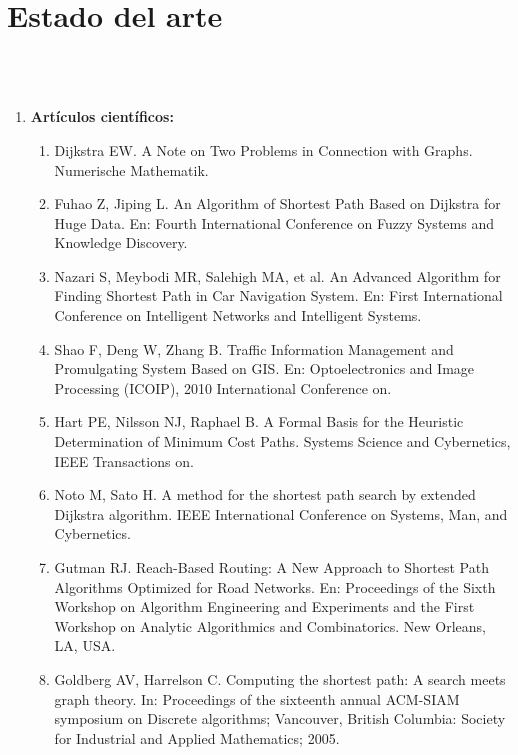 \documentclass[a4,papper]{IEEEtran}
\begin{document}
\newpage
\section{Estado del arte}
\\\\
\begin{enumerate}
    \item  {\noindent \large \bf {Artículos científicos:}}

\begin{enumerate}
    \item Dijkstra EW. A Note on Two Problems in Connection with Graphs. Numerische Mathematik.
    
    \item Fuhao Z, Jiping L. An Algorithm of Shortest Path Based on Dijkstra for Huge Data. En: Fourth
International Conference on Fuzzy Systems and Knowledge Discovery.

    \item Nazari S, Meybodi MR, Salehigh MA, et al. An Advanced Algorithm for Finding Shortest Path in Car
Navigation System. En: First International Conference on Intelligent Networks and Intelligent
Systems.

    \item Shao F, Deng W, Zhang B. Traffic Information Management and Promulgating System Based on
GIS. En: Optoelectronics and Image Processing (ICOIP), 2010 International Conference on.

    \item Hart PE, Nilsson NJ, Raphael B. A Formal Basis for the Heuristic Determination of Minimum Cost
Paths. Systems Science and Cybernetics, IEEE Transactions on.

    \item Noto M, Sato H. A method for the shortest path search by extended Dijkstra algorithm. IEEE
International Conference on Systems, Man, and Cybernetics.

    \item Gutman RJ. Reach-Based Routing: A New Approach to Shortest Path Algorithms Optimized for
Road Networks. En: Proceedings of the Sixth Workshop on Algorithm Engineering and
Experiments and the First Workshop on Analytic Algorithmics and Combinatorics. New Orleans,
LA, USA.

    \item Goldberg AV, Harrelson C. Computing the shortest path: A search meets graph theory. In:
Proceedings of the sixteenth annual ACM-SIAM symposium on Discrete algorithms; Vancouver,
British Columbia: Society for Industrial and Applied Mathematics; 2005.


\end{enumerate}
\end{enumerate}
\end{document}
